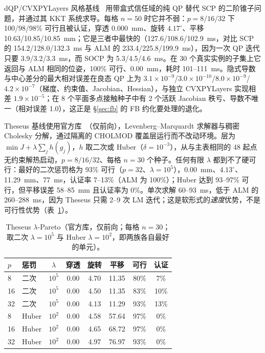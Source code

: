 dQP/CVXPYLayers 风格基线~\cite{magoon2025dqp,agrawal2019cvxpylayers} 用带盒式信任域的纯 QP 替代 SCP 的二阶锥子问题，并通过其 KKT 系统求导。每格 $n=50$ 时它并不弱：$p=8/16/32$ 下 100/98/98\% 可行且被认证，穿透 0.000~mm、旋转 $4.17^\circ$、平移 10.63/10.85/10.85~mm；它是三者中最快的（127.6/108.6/102.9~ms，对比 SCP 的 154.2/128.0/132.3~ms 与 ALM 的 233.4/225.8/199.9~ms），因为一次 QP 迭代只要 3.9/3.2/3.3~ms，而 SOCP 为 5.3/4.5/4.6~ms。在 30 个真实实例的子集上它返回与 ALM 相同的位姿，100\% 可行、0.00~mm，耗时 101--111~ms。隐式导数与中心差分的最大相对误差在良态 QP 上为 $3.1\times10^{-9}$/$3.0\times10^{-10}$/$8.0\times10^{-9}$/$4.2\times10^{-7}$（梯度、约束值、Jacobian、Hessian），与独立 CVXPYLayers 实现相差 $1.9\times10^{-5}$；在 8 个平面多点接触种子中有 2 个活跃 Jacobian 秩亏、导数不唯一（相对误差 1.0），这正是 \S\ref{sec:fb} 的 FB 约化要处理的退化。

Theseus 基线使用官方库~\cite{pineda2022theseus}（仅前向），Levenberg--Marquardt 求解器与稠密 Cholesky 分解，通过隔离的 CHOLMOD 覆盖层运行而不改动环境。层为 $\min J+\lambda\sum_j h(g_j)$，$h$ 取二次或 Huber（$\delta=10^{-3}$），从与主表相同的 48 起点无约束解热启动，$p=8/16/32$、每格 $n=30$ 个种子。任何有限 $\lambda$ 都到不了硬可行：最好的二次惩罚格为 93\% 可行（$p=32$、$\lambda=10^5$），0.00~mm、$4.13^\circ$、11.29~mm、77~ms，认证率 7--13\%（ALM 为 100\%）；Huber 达到 93--97\% 可行，但平移误差 58--85~mm 且认证率为 0\%。单次求解 60--93~ms，低于 ALM 的 260--288~ms，因为 Theseus 只需 2--9 次 LM 迭代；这是软形式的\emph{速度}优势，不是可行性优势（表~\ref{tab:theseus}）。

\begin{table}[t]
\centering
\caption{Theseus $\lambda$-Pareto（官方库，仅前向；每格 $n=30$；取二次 $\lambda=10^5$ 与 Huber $\lambda=10^2$，即两族各自最好的单元）。}
\label{tab:theseus}
\scriptsize
\setlength{\tabcolsep}{2.4pt}
\begin{tabular}{@{}llcccccc@{}}
\toprule
$p$ & 惩罚 & $\lambda$ & 穿透 & 旋转 & 平移 & 可行 & 认证 \\
\midrule
8 & 二次 & $10^5$ & 0.00 & 4.70 & 11.35 & 80\% & 7\% \\
16 & 二次 & $10^5$ & 0.00 & 4.50 & 11.35 & 83\% & 10\% \\
32 & 二次 & $10^5$ & 0.00 & 4.13 & 11.29 & 93\% & 13\% \\
8 & Huber & $10^2$ & 0.00 & 4.58 & 57.64 & 97\% & 0\% \\
16 & Huber & $10^2$ & 0.00 & 4.65 & 68.72 & 97\% & 0\% \\
32 & Huber & $10^2$ & 0.00 & 4.97 & 76.97 & 93\% & 0\% \\
\bottomrule
\end{tabular}
\end{table}

